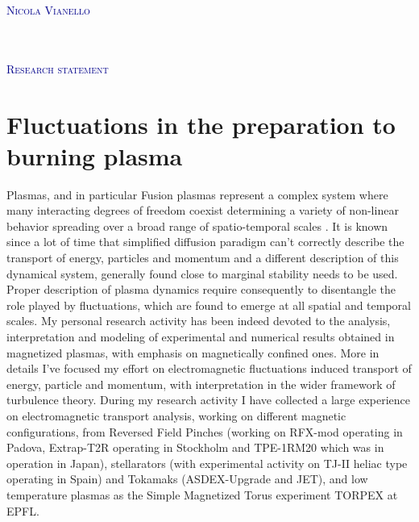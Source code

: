 \documentclass[12pt,a4paper]{article}
\begin{document}
\begin{flushright}
\textcolor{darkBlue}{ \Huge
\lettrine[lines=3,findent=-1pt, loversize = -0.42,
lraise=0.6]{N}{icola Vianello}}\\[2pt]
\textcolor{Gray}{}\\
\textcolor{Gray}{}\\
\textcolor{Gray}{}
\end{flushright}
\begin{flushleft} 
\textcolor{darkBlue}{ \Huge
\lettrine[lines=2,findent=-1pt, loversize = -0.42,
lraise=0.6]{R}{esearch statement}} 
\end{flushleft}


\section*{Fluctuations in the preparation to burning plasma}
Plasmas, and in particular Fusion plasmas represent a complex system
where many interacting degrees of freedom coexist determining a
variety of non-linear behavior spreading over a broad range of
spatio-temporal scales
\cite{Kadomtsev:1992us,Sornette:2006dt}. It is known since a lot of
time that simplified diffusion paradigm can't correctly describe the
transport of energy, particles and momentum and a different
description of this dynamical system, generally found close to
marginal stability needs to be used. Proper description of plasma
dynamics require consequently to disentangle the role played by
fluctuations, which are found to emerge at all spatial and temporal
scales. My personal research activity has been indeed devoted to the analysis,
interpretation and modeling of experimental and numerical results
obtained in magnetized plasmas, with emphasis
on magnetically confined ones. More in details I've focused my effort
on electromagnetic fluctuations induced transport of energy, particle
and momentum, with interpretation in the wider framework of turbulence
theory. During my research activity I have collected a large
experience on electromagnetic transport analysis, working on different
magnetic configurations, from Reversed Field Pinches (working on
RFX-mod operating in Padova, Extrap-T2R operating in Stockholm and
TPE-1RM20 which was in operation in Japan), stellarators (with
experimental activity on TJ-II heliac type operating in Spain) and Tokamaks
(ASDEX-Upgrade and JET), and low temperature plasmas as the Simple
Magnetized Torus experiment TORPEX at EPFL. 
\end{document}
